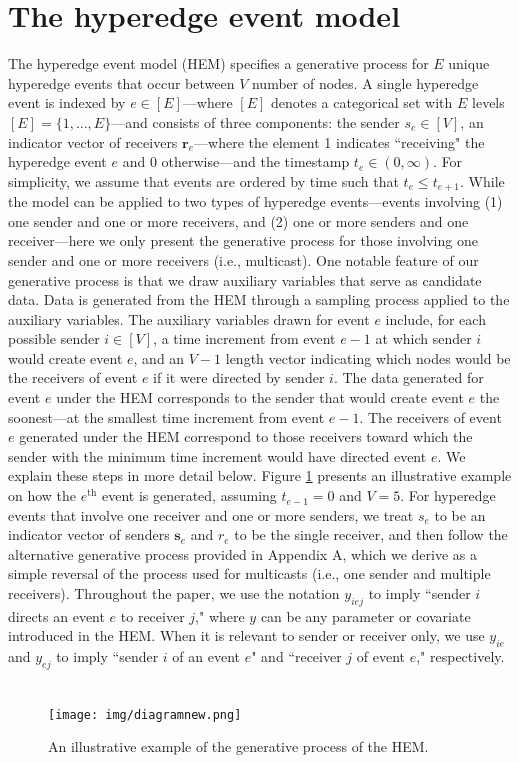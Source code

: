 \documentclass[ba]{imsart}
\numberwithin{equation}{section}
\theoremstyle{plain}
\begin{document}
	\section{The hyperedge event model}\label{sec:generative process}
	

	The hyperedge event model (HEM) specifies a generative process for $E$ unique hyperedge events that occur between $V$ number of nodes. A single hyperedge event is indexed by $e \in [E]$---where $[E]$ denotes a categorical set with $E$ levels $[E] = \{1,\ldots,E\}$---and consists of three components: the sender $s_e \in [V]$, an indicator vector of receivers $\boldsymbol{r}_e$---where the element 1 indicates ``receiving" the hyperedge event $e$ and 0 otherwise---and the timestamp $t_e \in (0, \infty)$. For simplicity, we assume that events are ordered by time such that $t_e \leq t_{e+1}$. While the model can be applied to two types of hyperedge events---events involving (1) one sender and one or more receivers, and (2) one or more senders and one receiver---here we only present the generative process for those involving one sender and one or more receivers (i.e., multicast). One notable feature of our generative process is that we draw auxiliary variables that serve as candidate data. Data is generated from the HEM through a sampling process applied to the auxiliary variables. The auxiliary variables drawn for event $e$ include, for each possible sender $i \in [V]$, a time increment from event $e-1$ at which sender $i$ would create event $e$, and an $V-1$ length vector indicating which nodes would be the receivers of event $e$ if it were directed by sender $i$.  The data generated for event $e$ under the HEM corresponds to the sender that would create event $e$ the soonest---at the smallest time increment from event $e-1$. The receivers of event $e$ generated under the HEM correspond to those receivers toward which the sender with the minimum time increment would have directed event $e$. We explain these steps in more detail below. Figure \ref{figure:diagram} presents an illustrative example on how the $e^{\textrm{th}}$ event is generated, assuming $t_{e-1} = 0$ and $V=5$. For hyperedge events that involve one receiver and one or more senders, we treat $s_e$ to be an indicator vector of senders $\boldsymbol{s}_e$ and $r_e$ to be the single receiver, and then follow the alternative generative process provided in Appendix A, which we derive as a simple reversal of the process used for multicasts (i.e., one sender and multiple receivers). Throughout the paper, we use the notation $y_{iej}$ to imply ``sender $i$ directs an event $e$ to receiver $j$," where $y$ can be any parameter or covariate introduced in the HEM. When it is relevant to sender or receiver only, we use $y_{ie}$ and $y_{ej}$ to imply ``sender $i$ of an event $e$" and ``receiver $j$ of event $e$," respectively. ~
			\begin{figure}[!t]
				\centering
				\texttt{[image: img/diagramnew.png]}	
				\caption {An illustrative example of the generative process of the HEM.}
				\label{figure:diagram}
			\end{figure}	
\end{document}
